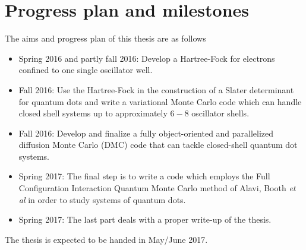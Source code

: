 \documentclass[twocolumn]{revtex4}
\begin{document}
\section*{Progress plan and milestones}
The aims and progress plan of this thesis are as follows
\begin{itemize}
\item Spring 2016 and partly fall 2016:  Develop a Hartree-Fock for electrons confined to one single oscillator well.
\item Fall 2016: Use the Hartree-Fock in the construction of a Slater determinant for quantum dots
and write a variational Monte Carlo code which can handle closed shell systems up to approximately
$6-8$ oscillator shells.
\item Fall 2016:
Develop and finalize a fully object-oriented and parallelized diffusion   Monte Carlo (DMC) code
that can tackle closed-shell quantum dot systems.
\item Spring 2017: The final step is to write a code which employs the Full Configuration Interaction Quantum Monte Carlo method of Alavi, Booth {\em et al} in order to study systems of quantum dots. 
\item Spring 2017: The last part deals with a proper write-up of the thesis. 
\end{itemize}
 
The thesis is expected to be handed in May/June 2017.
\end{document}
